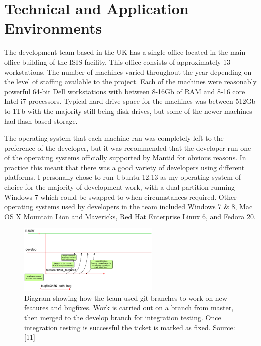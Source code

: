 \documentclass[paper=a4, fontsize=11pt]{scrartcl}	%
\numberwithin{equation}{section}															%
\numberwithin{figure}{section}																%
\numberwithin{table}{section}
\begin{document}
\clearpage
\section{Technical and Application
Environments}\label{technical-and-application-environments}

The development team based in the UK has a single office located in the
main office building of the ISIS facility. This office consists of
approximately 13 workstations. The number of machines varied throughout
the year depending on the level of staffing available to the project.
Each of the machines were reasonably powerful 64-bit Dell workstations
with between 8-16Gb of RAM and 8-16 core Intel i7 processors. Typical
hard drive space for the machines was between 512Gb to 1Tb with the
majority still being disk drives, but some of the newer machines had
flash based storage.

The operating system that each machine ran was completely left to the
preference of the developer, but it was recommended that the developer
run one of the operating systems officially supported by Mantid for
obvious reasons. In practice this meant that there was a good variety of
developers using different platforms. I personally chose to run Ubuntu
12.13 as my operating system of choice for the majority of development
work, with a dual partition running Windows 7 which could be swapped to
when circumstances required. Other operating systems used by developers
in the team included Windows 7 \& 8, Mac OS X Mountain Lion and
Mavericks, Red Hat Enterprise Linux 6, and Fedora 20.


\begin{figure}[H]
\centering
\includegraphics[width=0.6\textwidth]{img/GitWorflow-Dev.png}
\caption{Diagram showing how the team used git branches to work on new features and bugfixes. Work is carried out on a branch from master, then merged to the develop branch for integration testing. Once integration testing is successful the ticket is marked as fixed. Source: {[}11{]}}
\label{fig:git-dev-flow}
\end{figure}
\end{document}
